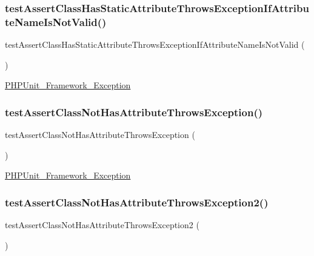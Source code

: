 \subsubsection{\texorpdfstring{test\+Assert\+Class\+Has\+Static\+Attribute\+Throws\+Exception\+If\+Attribute\+Name\+Is\+Not\+Valid()}{testAssertClassHasStaticAttributeThrowsExceptionIfAttributeNameIsNotValid()}}
{\footnotesize\ttfamily test\+Assert\+Class\+Has\+Static\+Attribute\+Throws\+Exception\+If\+Attribute\+Name\+Is\+Not\+Valid (\begin{DoxyParamCaption}{ }\end{DoxyParamCaption})}

\mbox{\hyperlink{class_p_h_p_unit___framework___exception}{P\+H\+P\+Unit\+\_\+\+Framework\+\_\+\+Exception}} \mbox{\label{class_framework___assert_test_a568c036e63a7cd6d34d84eaa73d5ef7e}} 
\subsubsection{\texorpdfstring{test\+Assert\+Class\+Not\+Has\+Attribute\+Throws\+Exception()}{testAssertClassNotHasAttributeThrowsException()}}
{\footnotesize\ttfamily test\+Assert\+Class\+Not\+Has\+Attribute\+Throws\+Exception (\begin{DoxyParamCaption}{ }\end{DoxyParamCaption})}

\mbox{\hyperlink{class_p_h_p_unit___framework___exception}{P\+H\+P\+Unit\+\_\+\+Framework\+\_\+\+Exception}} \mbox{\label{class_framework___assert_test_a9fd2fefc6cd660f64d6483144c09c926}} 
\subsubsection{\texorpdfstring{test\+Assert\+Class\+Not\+Has\+Attribute\+Throws\+Exception2()}{testAssertClassNotHasAttributeThrowsException2()}}
{\footnotesize\ttfamily test\+Assert\+Class\+Not\+Has\+Attribute\+Throws\+Exception2 (\begin{DoxyParamCaption}{ }\end{DoxyParamCaption})}

